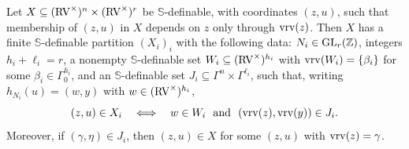 \begin{lem}\label{lem:relative:chart}
Let $X\subseteq(\mathrm{RV}^\times)^n\times(\mathrm{RV}^\times)^r$ be $\mathbb S$-definable,
with coordinates $(z,u)$, such that membership of $(z,u)$ in $X$ depends on
$z$ only through $\operatorname{vrv}(z)$. Then $X$ has a finite $\mathbb S$-definable
partition $(X_i)_i$ with the following data: $N_i\in\operatorname{GL}_r(\mathbb Z)$, integers
$h_i+\ell_i=r$, a nonempty $\mathbb S$-definable set
$W_i\subseteq(\mathrm{RV}^\times)^{h_i}$ with $\operatorname{vrv}(W_i)=\{\beta_i\}$ for some
$\beta_i\in\Gamma_0^{h_i}$, and an $\mathbb S$-definable set
$J_i\subseteq\Gamma^n\times\Gamma^{\ell_i}$, such that, writing
$h_{N_i}(u)=(w,y)$ with $w\in(\mathrm{RV}^\times)^{h_i}$,
\begin{equation}\label{relative:monomial:chart}
 (z,u)\in X_i\quad\Longleftrightarrow\quad
 w\in W_i\ \text{ and }\ (\operatorname{vrv}(z),\operatorname{vrv}(y))\in J_i .
\end{equation}
Moreover, if $(\gamma,\eta)\in J_i$, then $(z,u)\in X$ for some $(z,u)$ with
$\operatorname{vrv}(z)=\gamma$.
\end{lem}

